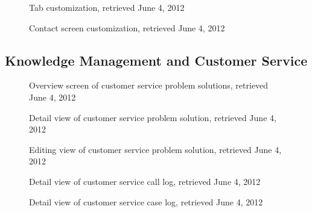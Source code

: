 \begin{figure}[htbp]
	\centering
	\caption[salesforce.com: Tab customization]{Tab customization, retrieved June 4, 2012}
\end{figure}

\begin{figure}[htbp]
	\centering
	\caption[salesforce.com: Contact screen customization]{Contact screen customization, retrieved June 4, 2012}
\end{figure}

\FloatBarrier
\subsection{Knowledge Management and Customer Service}
\begin{figure}[htbp]
	\centering
	\caption[salesforce.com: Overview screen of customer service problem solutions]{Overview screen of customer service problem solutions, retrieved June 4, 2012}
\end{figure}

\begin{figure}[htbp]
	\centering
	\caption[salesforce.com: Detail view of customer service problem solution]{Detail view of customer service problem solution, retrieved June 4, 2012}
\end{figure}

\begin{figure}[htbp]
	\centering
	\caption[salesforce.com: Editing view of customer service problem solution]{Editing view of customer service problem solution, retrieved June 4, 2012}
\end{figure}

\begin{figure}[htbp]
	\centering
	\caption[salesforce.com: Detail view of customer service call log]{Detail view of customer service call log, retrieved June 4, 2012}
\end{figure}

\begin{figure}[htbp]
	\centering
	\caption[salesforce.com: Detail view of customer service case log]{Detail view of customer service case log, retrieved June 4, 2012}
\end{figure}

